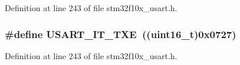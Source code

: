 Definition at line 243 of file stm32f10x\+\_\+usart.\+h.

\subsubsection[{\texorpdfstring{U\+S\+A\+R\+T\+\_\+\+I\+T\+\_\+\+T\+XE}{USART_IT_TXE}}]{\setlength{\rightskip}{0pt plus 5cm}\#define U\+S\+A\+R\+T\+\_\+\+I\+T\+\_\+\+T\+XE~(({\bf uint16\+\_\+t})0x0727)}\hypertarget{group___u_s_a_r_t___interrupt__definition_gab18d0fe889204a4c34f6d5817fb5147d}{}\label{group___u_s_a_r_t___interrupt__definition_gab18d0fe889204a4c34f6d5817fb5147d}


Definition at line 243 of file stm32f10x\+\_\+usart.\+h.

